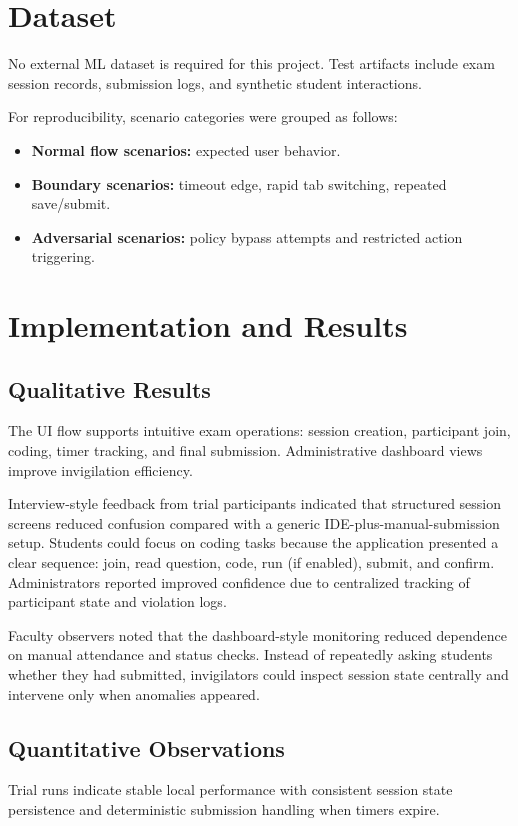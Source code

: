 \documentclass[12pt,a4paper]{report}
\begin{document}
	\section{Dataset}
	No external ML dataset is required for this project. Test artifacts include exam session records, submission logs, and synthetic student interactions.
	
	For reproducibility, scenario categories were grouped as follows:
	\begin{itemize}
		\item \textbf{Normal flow scenarios:} expected user behavior.
		\item \textbf{Boundary scenarios:} timeout edge, rapid tab switching, repeated save/submit.
		\item \textbf{Adversarial scenarios:} policy bypass attempts and restricted action triggering.
	\end{itemize}
	
	\section{Implementation and Results}
	\subsection{Qualitative Results}
	The UI flow supports intuitive exam operations: session creation, participant join, coding, timer tracking, and final submission. Administrative dashboard views improve invigilation efficiency.
	
	Interview-style feedback from trial participants indicated that structured session screens reduced confusion compared with a generic IDE-plus-manual-submission setup. Students could focus on coding tasks because the application presented a clear sequence: join, read question, code, run (if enabled), submit, and confirm. Administrators reported improved confidence due to centralized tracking of participant state and violation logs.
	
	Faculty observers noted that the dashboard-style monitoring reduced dependence on manual attendance and status checks. Instead of repeatedly asking students whether they had submitted, invigilators could inspect session state centrally and intervene only when anomalies appeared.
	
	\subsection{Quantitative Observations}
	Trial runs indicate stable local performance with consistent session state persistence and deterministic submission handling when timers expire.
	
\end{document}
